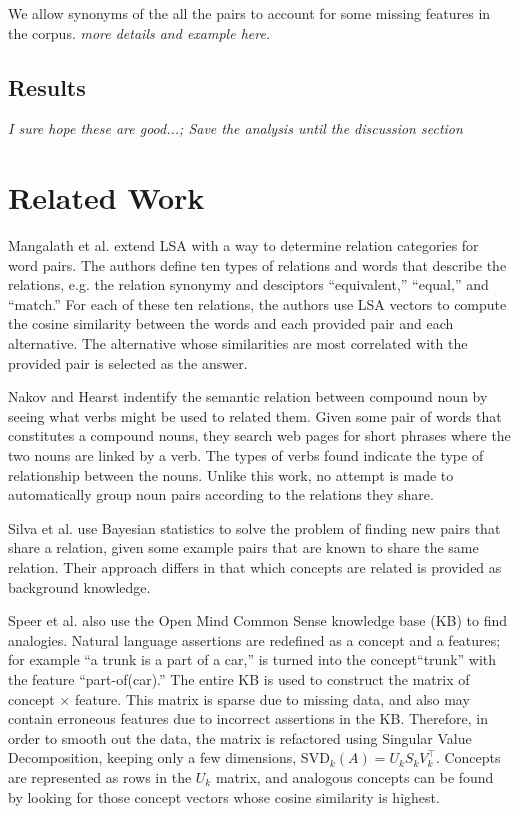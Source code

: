 \documentclass[11pt]{article}
\begin{document}
We allow synonyms of the all the pairs to account for some missing features in
the corpus.  \emph{more details and example here.}

\subsection{Results}

\emph{I sure hope these are good...; Save the analysis until the discussion
  section}

\section{Related Work}
\label{sec:related}


Mangalath et al. extend LSA\cite{landauer88introduction} with a way to determine
relation categories for word pairs\cite{mangalath04analogy}.  The authors define
ten types of relations and words that describe the relations, e.g. the
relation synonymy and desciptors ``equivalent,'' ``equal,'' and ``match.''  For
each of these ten relations, the authors use LSA vectors to compute the cosine
similarity between the words and each provided pair and each alternative.  The
alternative whose similarities are most correlated with the provided pair is
selected as the answer.

Nakov and Hearst indentify the semantic relation between compound noun by seeing
what verbs might be used to related them\cite{nakov06using}.  Given some pair of
words that constitutes a compound nouns, they search web pages for short phrases
where the two nouns are linked by a verb.  The types of verbs found indicate the
type of relationship between the nouns.  Unlike this work, no attempt is made to
automatically group noun pairs according to the relations they share. 

Silva et al. use Bayesian statistics to solve the problem of finding new pairs
that share a relation, given some example pairs that are known to share the same
relation\cite{silva07analogical}.  Their approach differs in that which concepts
are related is provided as background knowledge.  

Speer et al. also use the Open Mind Common Sense knowledge base (KB) to find
analogies\cite{speer08analogyspace}.  Natural language assertions are redefined
as a concept and a features; for example ``a trunk is a part of a car,'' is
turned into the concept``trunk'' with the feature ``part-of(car).''  The entire
KB is used to construct the matrix of concept $\times$ feature.  This matrix is
sparse due to missing data, and also may contain erroneous features due to
incorrect assertions in the KB.  Therefore, in order to smooth out the data, the
matrix is refactored using Singular Value Decomposition, keeping only a few
dimensions, SVD$_k(A) = U_kS_kV_k^{\top}$.  Concepts are represented as rows
in the $U_k$ matrix, and analogous concepts can be found by looking for those
concept vectors whose cosine similarity is highest.
\end{document}
